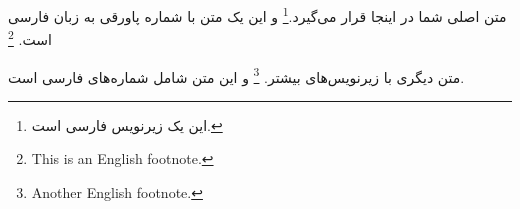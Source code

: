 \documentclass{article}
\newcommand{\englishfootnote}[1]{%
	\footnote{#1}%
}
\begin{document}
	
	متن اصلی شما در اینجا قرار می‌گیرد.\footnote{این یک زیرنویس فارسی است.} و این یک متن با شماره پاورقی به زبان فارسی است.\englishfootnote{This is an English footnote.}
	
	متن دیگری با زیرنویس‌های بیشتر.\englishfootnote{Another English footnote.} و این متن شامل شماره‌های فارسی است.
	
\end{document}
